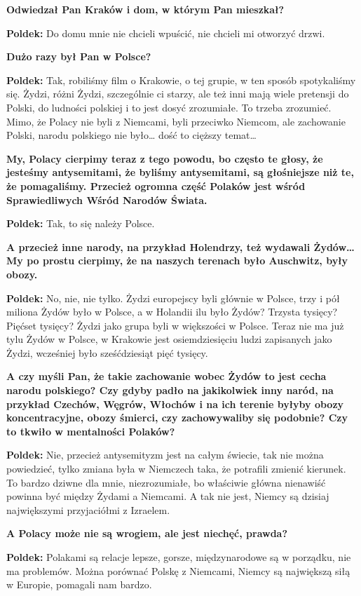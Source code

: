 \textbf{Odwiedzał Pan Kraków i dom, w którym Pan mieszkał?}\par
\textbf{Poldek:} Do domu mnie nie chcieli wpuścić, nie chcieli mi otworzyć drzwi.\par 
\textbf{Dużo razy był Pan w Polsce?}\par 
\textbf{Poldek:} Tak, robiliśmy film o Krakowie, o tej grupie, w ten sposób spotykaliśmy się. Żydzi, różni Żydzi, szczególnie ci starzy, ale też inni mają wiele pretensji do Polski, do ludności polskiej i to jest dosyć zrozumiałe. To trzeba zrozumieć. Mimo, że Polacy nie byli z Niemcami, byli przeciwko Niemcom, ale zachowanie Polski, narodu polskiego nie było… dość to cięższy temat…\par 
\textbf{My, Polacy cierpimy teraz z tego powodu, bo często te głosy, że jesteśmy antysemitami, że byliśmy antysemitami, są głośniejsze niż te, że pomagaliśmy. Przecież ogromna część Polaków jest wśród Sprawiedliwych Wśród Narodów Świata.}\par 
\textbf{Poldek:} Tak, to się należy Polsce.\par 
\textbf{A przecież inne narody, na przykład Holendrzy, też wydawali Żydów… My po prostu cierpimy, że na naszych terenach było Auschwitz, były obozy.}\par 
\textbf{Poldek:} No, nie, nie tylko. Żydzi europejscy byli głównie w Polsce, trzy i pół miliona Żydów było w Polsce, a w Holandii ilu było Żydów? Trzysta tysięcy? Pięćset tysięcy? Żydzi jako grupa byli w większości w Polsce. Teraz nie ma już tylu Żydów w Polsce, w Krakowie jest osiemdziesięciu ludzi zapisanych jako Żydzi, wcześniej było sześćdziesiąt pięć tysięcy.\par
\textbf{A czy myśli Pan, że takie zachowanie wobec Żydów to jest cecha narodu polskiego? Czy gdyby padło na jakikolwiek inny naród, na przykład Czechów, Węgrów, Włochów i na ich terenie byłyby obozy koncentracyjne, obozy śmierci, czy zachowywaliby się podobnie? Czy to tkwiło w mentalności Polaków?}\par
\textbf{Poldek:} Nie, przecież antysemityzm jest na całym świecie, tak nie można powiedzieć, tylko zmiana była w Niemczech taka, że potrafili zmienić kierunek. To bardzo dziwne dla mnie, niezrozumiałe, bo właściwie główna nienawiść powinna być między Żydami a Niemcami. A tak nie jest, Niemcy są dzisiaj największymi przyjaciółmi z Izraelem.\par
\textbf{A Polacy może nie są wrogiem, ale jest niechęć, prawda?}\par 
\textbf{Poldek:} Polakami są relacje lepsze, gorsze, międzynarodowe są w porządku, nie ma problemów. Można porównać Polskę z Niemcami, Niemcy są największą siłą w Europie, pomagali nam bardzo.   

 